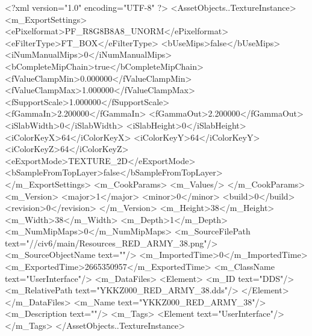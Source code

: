 <?xml version="1.0" encoding="UTF-8" ?>
<AssetObjects..TextureInstance>
	<m_ExportSettings>
		<ePixelformat>PF_R8G8B8A8_UNORM</ePixelformat>
		<eFilterType>FT_BOX</eFilterType>
		<bUseMips>false</bUseMips>
		<iNumManualMips>0</iNumManualMips>
		<bCompleteMipChain>true</bCompleteMipChain>
		<fValueClampMin>0.000000</fValueClampMin>
		<fValueClampMax>1.000000</fValueClampMax>
		<fSupportScale>1.000000</fSupportScale>
		<fGammaIn>2.200000</fGammaIn>
		<fGammaOut>2.200000</fGammaOut>
		<iSlabWidth>0</iSlabWidth>
		<iSlabHeight>0</iSlabHeight>
		<iColorKeyX>64</iColorKeyX>
		<iColorKeyY>64</iColorKeyY>
		<iColorKeyZ>64</iColorKeyZ>
		<eExportMode>TEXTURE_2D</eExportMode>
		<bSampleFromTopLayer>false</bSampleFromTopLayer>
	</m_ExportSettings>
	<m_CookParams>
		<m_Values/>
	</m_CookParams>
	<m_Version>
		<major>1</major>
		<minor>0</minor>
		<build>0</build>
		<revision>0</revision>
	</m_Version>
	<m_Height>38</m_Height>
	<m_Width>38</m_Width>
	<m_Depth>1</m_Depth>
	<m_NumMipMaps>0</m_NumMipMaps>
	<m_SourceFilePath text="//civ6/main/Resources_RED_ARMY_38.png"/>
	<m_SourceObjectName text=""/>
	<m_ImportedTime>0</m_ImportedTime>
	<m_ExportedTime>2665350957</m_ExportedTime>
	<m_ClassName text="UserInterface"/>
	<m_DataFiles>
		<Element>
			<m_ID text="DDS"/>
			<m_RelativePath text="YKKZ000_RED_ARMY_38.dds"/>
		</Element>
	</m_DataFiles>
	<m_Name text="YKKZ000_RED_ARMY_38"/>
	<m_Description text=""/>
	<m_Tags>
		<Element text="UserInterface"/>
	</m_Tags>
</AssetObjects..TextureInstance>

